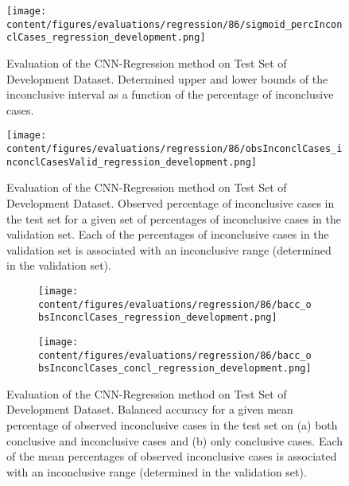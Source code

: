 \begin{figure}[t]
  \centering
  \texttt{[image: content/figures/evaluations/regression/86/sigmoid\_percInconclCases\_regression\_development.png]}
  \caption{Evaluation of the CNN-Regression method on Test Set of Development Dataset. 
  Determined upper and lower bounds of the inconclusive interval as a function of the percentage of inconclusive cases.} 
  \label{fig:regression_percInconclCases_development}
\end{figure}


\begin{figure}[h]
  \centering
  \texttt{[image: content/figures/evaluations/regression/86/obsInconclCases\_inconclCasesValid\_regression\_development.png]}
  \caption{Evaluation of the CNN-Regression method on Test Set of Development Dataset.
  Observed percentage of inconclusive cases in the test set 
  for a given set of percentages of inconclusive cases in the validation set.
  Each of the percentages of inconclusive cases in the validation set is associated 
  with an inconclusive range (determined in the validation set).} 
  \label{fig:obsInconclCases_inconclCasesValid_regression_development}
\end{figure} 


\begin{figure}[t]
  \begin{subfigure}{0.9\textwidth}
    \centering
    \texttt{[image: content/figures/evaluations/regression/86/bacc\_obsInconclCases\_regression\_development.png]}
    \subcaption{}
    \label{fig:bacc_obsInconclCases_regression_development}
  \end{subfigure}
  \hfill
  \begin{subfigure}{0.9\textwidth}
    \centering
    \texttt{[image: content/figures/evaluations/regression/86/bacc\_obsInconclCases\_concl\_regression\_development.png]}
    \subcaption{}
    \label{fig:bacc_obsInconclCases_concl_regression_development}
  \end{subfigure}

  \caption{Evaluation of the CNN-Regression method on Test Set of Development Dataset.
  Balanced accuracy for a given mean percentage of observed inconclusive cases in the test set on 
  (a) both conclusive and inconclusive cases and (b) only conclusive cases. 
  Each of the mean percentages of observed inconclusive cases is associated with an inconclusive range (determined in the validation set). }
  \label{fig:bacc_obsInconclCases_regression_development_full}
\end{figure}

